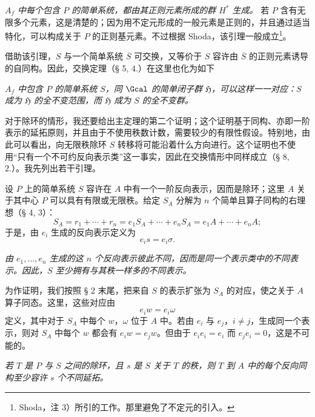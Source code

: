 \noindent\textbf{} \emph{\(A_f\) 中每个包含 \(P\) 的简单系统，都由其正则元素所成的群 \(H^*\) 生成。} 若 \(P\) 含有无限多个元素，这是清楚的；因为用不定元形成的\glqq{}一般元素\grqq{}是正则的，并且通过适当特化，可以构成关于 \(P\) 的正则基元素。不过根据 Shoda，该引理一般成立\footnote{Shoda，注 3）所引的工作。那里避免了不定元的引入。}。

借助该引理，\(S\) 与一个简单系统 \(\overline S\) 可交换，又等价于 \(S\) 容许由 \(\overline S\) 的正则元素诱导的自同构。因此，交换定理（§ 5, 4.）在这里也化为如下

\noindent\textbf{} \emph{\(A_f\) 中包含 \(P\) 的简单系统 \(S\)，同 \(\Gcal\) 的简单闭子群 \(\mathfrak H\)，可以这样一一对应：\(S\) 成为 \(\mathfrak H\) 的全不变范围，而 \(\mathfrak H\) 成为 \(S\) 的全不变群。}

\noindent\textbf{}
对于除环的情形，我还要给出主定理的第二个证明；这个证明基于同构、亦即一阶表示的延拓原则，并且由于不使用秩数计数，需要较少的有限性假设。特别地，由此可以看出，向无限秩除环 \(S\) 转移将可能沿着什么方向进行。这个证明也不使用“只有一个不可约反向表示类”这一事实，因此在交换情形中同样成立（§ 8, 2.）。我先列出若干引理。

\noindent\textbf{} 设 \(P\) 上的简单系统 \(S\) 容许在 \(A\) 中有一个一阶反向表示，因而是除环；这里 \(A\) 关于其中心 \(P\) 可以具有有限或无限秩。给定 \(S_A\) 分解为 \(n\) 个简单且算子同构的右理想（§ 4, 3）：
\[
        S_A=r_1+\cdots+r_n
            =e_1S_A+\cdots+e_nS_A
            =e_1A+\cdots+e_nA ;
\]
于是，由 \(e_i\) 生成的反向表示定义为
\[
        e_i s=e_i\sigma .
\]

\noindent\textbf{} \emph{由 \(e_1,\ldots,e_n\) 生成的这 \(n\) 个反向表示彼此不同，因而是同一个表示类中的不同表示。因此，\(S\) 至少拥有与其秩一样多的不同表示。}

为作证明，我们按照 § 2 末尾，把来自 \(S\) 的表示扩张为 \(S_A\) 的对应，使之关于 \(A\) 算子同态。这里，这些对应由
\[
        e_i w=e_i\omega
\]
定义，其中对于 \(S_A\) 中每个 \(w\)，\(\omega\) 位于 \(A\) 中。若由 \(e_i\) 与 \(e_j\)，\(i\ne j\)，生成同一个表示，则对 \(S_A\) 中每个 \(w\) 都会有 \(e_iw=e_jw\)。但由于 \(e_ie_i=e_i\) 而 \(e_je_i=0\)，这是不可能的。

\noindent\textbf{} \emph{若 \(T\) 是 \(P\) 与 \(S\) 之间的除环，且 \(s\) 是 \(S\) 关于 \(T\) 的秩，则 \(T\) 到 \(A\) 中的每个反向同构至少容许 \(s\) 个不同延拓。}

